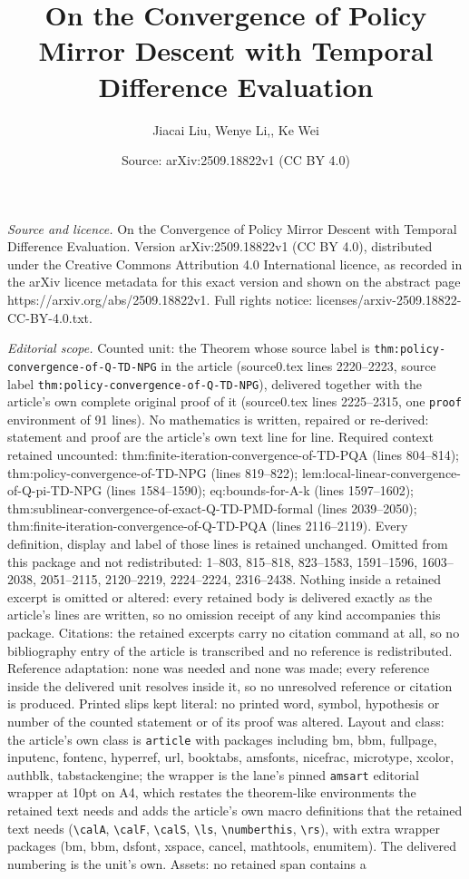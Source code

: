 \documentclass[10pt,a4paper]{amsart}
\title[On the Convergence of Policy Mirror Descent with Temporal Di]{On the Convergence of Policy Mirror Descent with Temporal Difference Evaluation}
\author{Jiacai Liu, Wenye Li,, Ke Wei}
\date{Source: arXiv:2509.18822v1 (CC BY 4.0)}
\begin{document}
\maketitle

\noindent\emph{Source and licence.} On the Convergence of Policy Mirror Descent with Temporal Difference Evaluation. Version arXiv:2509.18822v1 (CC BY 4.0), distributed under the Creative Commons Attribution 4.0 International licence, as recorded in the arXiv licence metadata for this exact version and shown on the abstract page https://arxiv.org/abs/2509.18822v1. Full rights notice: licenses/arxiv-2509.18822-CC-BY-4.0.txt.\par\smallskip

\noindent\textit{Editorial scope.} Counted unit: the Theorem whose source label is \texttt{thm:policy-convergence-of-Q-TD-NPG} in the article (source0.tex lines 2220--2223, source label \texttt{thm:policy-convergence-of-Q-TD-NPG}), delivered together with the article's own complete original proof of it (source0.tex lines 2225--2315, one \texttt{proof} environment of 91 lines). No mathematics is written, repaired or re-derived: statement and proof are the article's own text line for line. Required context retained uncounted: thm:finite-iteration-convergence-of-TD-PQA (lines 804--814); thm:policy-convergence-of-TD-NPG (lines 819--822); lem:local-linear-convergence-of-Q-pi-TD-NPG (lines 1584--1590); eq:bounds-for-A-k (lines 1597--1602); thm:sublinear-convergence-of-exact-Q-TD-PMD-formal (lines 2039--2050); thm:finite-iteration-convergence-of-Q-TD-PQA (lines 2116--2119). Every definition, display and label of those lines is retained unchanged. Omitted from this package and not redistributed: 1--803, 815--818, 823--1583, 1591--1596, 1603--2038, 2051--2115, 2120--2219, 2224--2224, 2316--2438. Nothing inside a retained excerpt is omitted or altered: every retained body is delivered exactly as the article's lines are written, so no omission receipt of any kind accompanies this package. Citations: the retained excerpts carry no citation command at all, so no bibliography entry of the article is transcribed and no reference is redistributed. Reference adaptation: none was needed and none was made; every reference inside the delivered unit resolves inside it, so no unresolved reference or citation is produced. Printed slips kept literal: no printed word, symbol, hypothesis or number of the counted statement or of its proof was altered. Layout and class: the article's own class is \texttt{article} with packages including bm, bbm, fullpage, inputenc, fontenc, hyperref, url, booktabs, amsfonts, nicefrac, microtype, xcolor, authblk, tabstackengine; the wrapper is the lane's pinned \texttt{amsart} editorial wrapper at 10pt on A4, which restates the theorem-like environments the retained text needs and adds the article's own macro definitions that the retained text needs (\texttt{\textbackslash calA}, \texttt{\textbackslash calF}, \texttt{\textbackslash calS}, \texttt{\textbackslash ls}, \texttt{\textbackslash numberthis}, \texttt{\textbackslash rs}), with extra wrapper packages (bm, bbm, dsfont, xspace, cancel, mathtools, enumitem). The delivered numbering is the unit's own. Assets: no retained span contains a 
\end{document}
